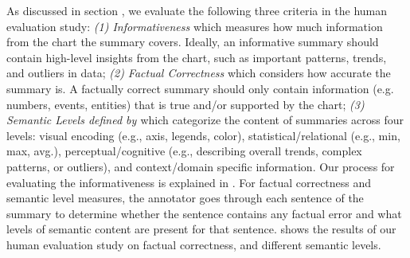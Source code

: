 \begin{table}[t!]
 \setlength\extrarowheight{2pt}
 \centering
 \caption{
  Human evaluation on summaries for 150 random samples from Chat2text Statista test split.
 }
 \label{tab:human_eval}
\end{table}

As discussed in section , we evaluate the following three criteria in the human evaluation study: \emph{(1) Informativeness} which measures how much information from the chart the summary covers. Ideally, an informative summary should contain high-level insights from the chart, such as important patterns, trends, and outliers in data; \emph{(2) Factual Correctness} which considers how accurate the summary is. A factually correct summary should only contain information (e.g. numbers, events, entities) that is true and/or supported by the chart; \emph{(3) Semantic Levels defined by \cite{lundgard2021accessible}} which categorize the content of summaries across four levels: visual encoding (e.g., axis, legends, color), statistical/relational  (e.g., min, max, avg.), perceptual/cognitive (e.g., describing overall trends, complex patterns, or outliers), and context/domain specific information. Our process for evaluating the informativeness is explained in . For factual correctness and semantic level measures, the annotator goes through each sentence of the summary to determine whether the sentence contains any factual error and what levels of semantic content are present for that sentence.
 shows the results of our human evaluation study on factual correctness, and different semantic levels.

